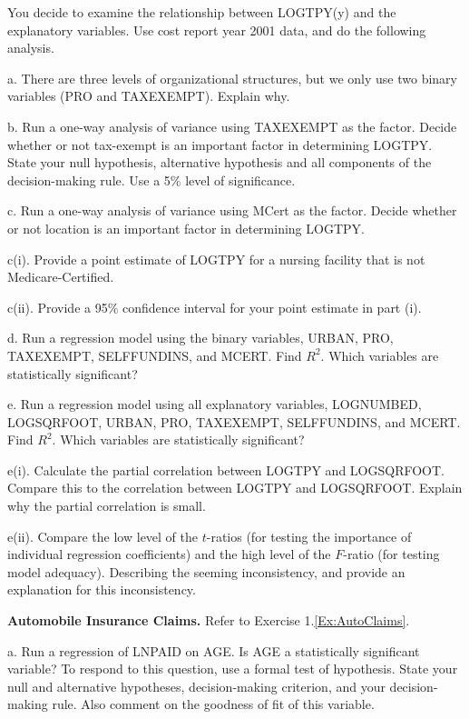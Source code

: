 \begin{exercises}
You decide to examine the relationship between LOGTPY(y) and the
explanatory variables. Use cost report year 2001 data, and do the
following analysis.

a. There are three levels of organizational structures, but we only
use two binary variables (PRO and TAXEXEMPT). Explain why.

b. Run a one-way analysis of variance using TAXEXEMPT as the factor.
Decide whether or not tax-exempt is an important factor in
determining LOGTPY. State your null hypothesis, alternative
hypothesis and all components of the decision-making rule. Use a 5\%
level of significance.

c. Run a one-way analysis of variance using MCert as the factor.
Decide whether or not location is an important factor in determining
LOGTPY.

c(i). Provide a point estimate of LOGTPY for a nursing facility that
is not Medicare-Certified.

c(ii).  Provide a 95\% confidence interval for your point estimate
in part (i).

d. Run a regression model using the binary variables, URBAN, PRO,
TAXEXEMPT, SELFFUNDINS, and MCERT. Find $R^2$. Which variables are
statistically significant?

e. Run a regression model using all explanatory variables,
LOGNUMBED, LOGSQRFOOT, URBAN, PRO, TAXEXEMPT, SELFFUNDINS, and
MCERT. Find $R^2$. Which variables are statistically significant?

e(i). Calculate the partial correlation between LOGTPY and
LOGSQRFOOT. Compare this to the correlation between LOGTPY and
LOGSQRFOOT. Explain why the partial correlation is small.

e(ii). Compare the low level of the $t$-ratios (for testing the
importance of individual regression coefficients) and the high level
of the $F$-ratio (for testing model adequacy). Describing the
seeming inconsistency, and provide an explanation for this
inconsistency.


\item \textbf{Automobile Insurance Claims.}\label{Ex:AutoClaims4} Refer to Exercise
1.\ref{Ex:AutoClaims}.

a. Run a regression of LNPAID on AGE. Is AGE a statistically
significant variable? To respond to this question, use a formal test
of hypothesis. State your null and alternative hypotheses,
decision-making criterion, and your decision-making rule. Also
comment on the goodness of fit of this variable.


\end{exercises}
